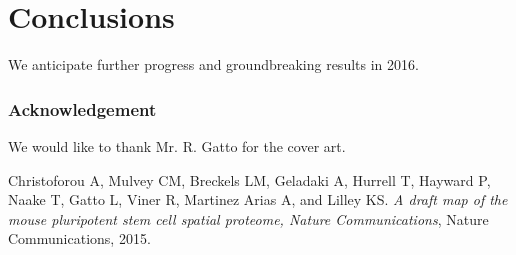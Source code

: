 \documentclass{article}
\begin{document}
\section*{Conclusions}

We anticipate further progress and groundbreaking results in 2016.

\bigskip

\subsubsection*{Acknowledgement}

We would like to thank Mr. R. Gatto for the cover art.

\begin{thebibliography}{1}

 Christoforou A, Mulvey CM, Breckels LM, Geladaki A,
  Hurrell T, Hayward P, Naake T, Gatto L, Viner R, Martinez Arias A,
  and Lilley KS. {\em A draft map of the mouse pluripotent stem cell
    spatial proteome, Nature Communications}, Nature Communications,
  2015.

\end{thebibliography}
\end{document}
